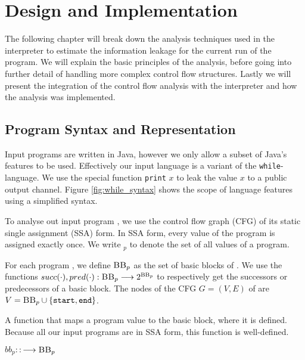 \chapter{Design and Implementation}\label{sec:impl}

The following chapter will break down the analysis techniques used in the interpreter to estimate the information leakage for the current run of the program. We will explain the basic principles of the analysis, before going into further detail of handling more complex control flow structures. Lastly we will present the integration of the control flow analysis with the interpreter and how the analysis was implemented.


\section{Program Syntax and Representation}

Input programs are written in Java, however we only allow a subset of Java's features to be used. Effectively our input language is a variant of the \texttt{while}-language. We use the special function \texttt{print} $x$ to leak the value $x$ to a public output channel. Figure \ref{fig:while_syntax} shows the scope of language features using a simplified syntax. 


To analyse out input program \p, we use the control flow graph (CFG) of its static single assignment (SSA) form. In SSA form, every value of the program is assigned exactly once. We write \val$_p$ to denote the set of all values of a program.

For each program \pp, we define $\textsc{BB}_p$ as the set of basic blocks of \pp. We use the functions $succ(\cdot), pred(\cdot): \textsc{BB}_p \longrightarrow 2^{\textsc{BB}_p}$ to respectively get the successors or predecessors of a basic block. The nodes of the CFG $G = (V, E)$ of \p are $V = \textsc{BB}_p \cup \{\mathtt{start}, \mathtt{end}\}$. 


\begin{definition}
    A function that maps a program value to the basic block, where it is defined. Because all our input programs are in SSA form, this function is well-defined.
    \begin{center}
        $bb_p\colon: $\val$ \longrightarrow \textsc{BB}_p$
    \end{center} 
\end{definition}

